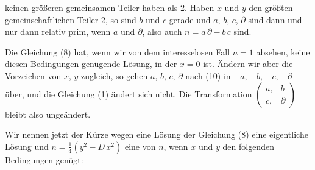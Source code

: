keinen größeren gemeinsamen Teiler haben als 2. Haben $x$ und $y$ den
größten gemeinschaftlichen Teiler 2, so sind $b$ und $c$ gerade und
$a$, $b$, $c$, $\partial$ sind dann und nur dann relativ prim, wenn $a$
und $\partial$, also auch $n = a\,\partial - b\,c$  sind.

Die Gleichung (8) hat, wenn wir von dem interesselosen Fall $n=1$
absehen, keine diesen Bedingungen genügende Lösung, in der $x=0$ ist.
Ändern wir aber die Vorzeichen von $x$, $y$ zugleich, so gehen $a$,
$b$, $c$, $\partial$ nach (10) in $-a$, $-b$, $-c$, $-\partial$ über, %
und die Gleichung (1) ändert sich nicht. Die Transformation
$\begin{pmatrix} a, & b\\ c, & \partial \end{pmatrix}$ bleibt also
ungeändert.

Wir nennen jetzt der Kürze wegen eine Lösung der Gleichung (8) eine
eigentliche Lösung und $n = \frac{1}{4}(y^2-D\,x^2)$ eine
 von $n$, wenn $x$ und $y$ den
folgenden Bedingungen genügt: %





